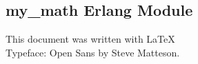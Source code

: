 \documentclass[xcolor=dvipsnames]{article}
\begin{document}
\newpage 

\begin{appendix}

\section{my\_math Erlang Module}\label{my_math}



\end{appendix}

\printnoidxglossaries

\newpage




\vfill
\begin{center}
This document was written with \LaTeX 
\\Typeface: Open Sans by Steve Matteson.
\end{center}

\end{document}
